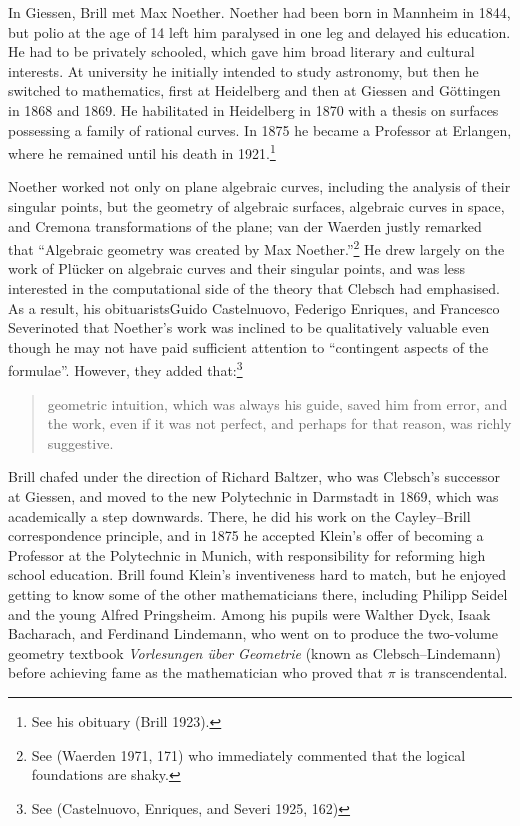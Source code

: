 In Giessen, Brill met Max Noether. Noether had been born in Mannheim in 1844, but polio at the age of 14 left him paralysed in one leg and delayed his education. He had to be privately schooled, which gave him  broad literary and cultural interests. At university he  initially intended to study astronomy, but then he switched to mathematics, first at Heidelberg and then at Giessen and G\"ottingen in 1868 and 1869. He habilitated in Heidelberg in 1870 with a thesis on surfaces possessing a family of rational curves. In 1875 he became a Professor at Erlangen, where he remained until his death in 1921.\footnote{See his obituary (Brill 1923).} 


Noether  worked not only on plane algebraic curves, including the analysis of their singular points, but the geometry of algebraic surfaces,  algebraic curves in space, and Cremona transformations of the plane;  van der Waerden justly remarked that ``Algebraic geometry was created by Max Noether.''\footnote{See (Waerden 1971, 171) who immediately commented that the logical foundations are shaky.} 
He drew largely on the work of Pl\"ucker on algebraic curves and their singular points, and was less interested in the computational side of the theory that Clebsch had emphasised. As a result, his obituarists\emdash Guido Castelnuovo, Federigo Enriques, and Francesco Severi\emdash noted that Noether's work was inclined to be qualitatively valuable even though he may not have paid sufficient attention to ``contingent aspects of the formulae''.  However, they added that:\footnote{See (Castelnuovo, Enriques, and Severi 1925, 162)}
\begin{quote}
geometric intuition, which was always his guide, saved him from error, and the work, even if it was not perfect, and perhaps for that reason, was richly suggestive.
\end{quote}



Brill  chafed under the direction of  Richard Baltzer, who was Clebsch's successor at Giessen,  and moved to the new Polytechnic in Darmstadt in 1869, which was academically a step downwards. There, he did his work on the Cayley--Brill correspondence principle, and in 1875  he accepted Klein's offer of becoming a Professor at the Polytechnic in Munich, with responsibility for reforming high school education.  Brill found Klein's inventiveness hard to match, but he enjoyed getting to know some of the other mathematicians there, including Philipp Seidel and the young Alfred Pringsheim. Among his pupils were Walther Dyck, Isaak Bacharach, and Ferdinand Lindemann, who went on to produce the two-volume geometry textbook \emph{Vorlesungen \"uber Geometrie} (known as Clebsch--Lindemann) before achieving fame as the mathematician who proved that $\pi$ is transcendental.


